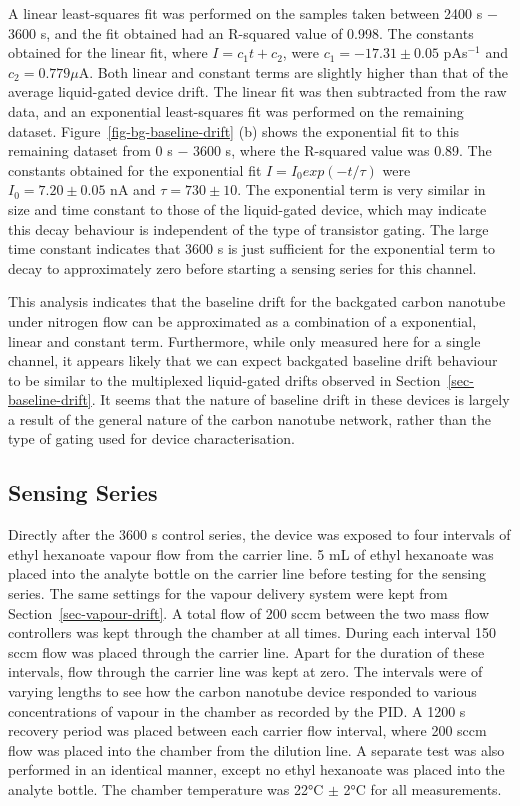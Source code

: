 \documentclass[
  a4paper,
]{scrbook}
\begin{document}
A linear least-squares fit was performed on the samples taken between
2400 s \(-\) 3600 s, and the fit obtained had an R-squared value of
0.998. The constants obtained for the linear fit, where
\(I = c_1t + c_2\), were \(c_1 = -17.31\pm0.05\) pAs\(^{-1}\) and
\(c_2 = 0.779 \mu\)A. Both linear and constant terms are slightly higher
than that of the average liquid-gated device drift. The linear fit was
then subtracted from the raw data, and an exponential least-squares fit
was performed on the remaining dataset.
Figure~\ref{fig-bg-baseline-drift} (b) shows the exponential fit to this
remaining dataset from 0 s \(-\) 3600 s, where the R-squared value was
0.89. The constants obtained for the exponential fit
\(I = I_0exp(-t/\tau)\) were \(I_0 = 7.20 \pm 0.05\) nA and
\(\tau = 730 \pm 10\). The exponential term is very similar in size and
time constant to those of the liquid-gated device, which may indicate
this decay behaviour is independent of the type of transistor gating.
The large time constant indicates that 3600 s is just sufficient for the
exponential term to decay to approximately zero before starting a
sensing series for this channel.

This analysis indicates that the baseline drift for the backgated carbon
nanotube under nitrogen flow can be approximated as a combination of a
exponential, linear and constant term. Furthermore, while only measured
here for a single channel, it appears likely that we can expect
backgated baseline drift behaviour to be similar to the multiplexed
liquid-gated drifts observed in Section~\ref{sec-baseline-drift}. It
seems that the nature of baseline drift in these devices is largely a
result of the general nature of the carbon nanotube network, rather than
the type of gating used for device characterisation.

\hypertarget{sec-EtHex-series}{%
\subsection{Sensing Series}\label{sec-EtHex-series}}

Directly after the 3600 s control series, the device was exposed to four
intervals of ethyl hexanoate vapour flow from the carrier line. 5 mL of
ethyl hexanoate was placed into the analyte bottle on the carrier line
before testing for the sensing series. The same settings for the vapour
delivery system were kept from Section~\ref{sec-vapour-drift}. A total
flow of 200 sccm between the two mass flow controllers was kept through
the chamber at all times. During each interval 150 sccm flow was placed
through the carrier line. Apart for the duration of these intervals,
flow through the carrier line was kept at zero. The intervals were of
varying lengths to see how the carbon nanotube device responded to
various concentrations of vapour in the chamber as recorded by the PID.
A 1200 s recovery period was placed between each carrier flow interval,
where 200 sccm flow was placed into the chamber from the dilution line.
A separate test was also performed in an identical manner, except no
ethyl hexanoate was placed into the analyte bottle. The chamber
temperature was 22°C \(\pm\) 2°C for all measurements.
\end{document}
